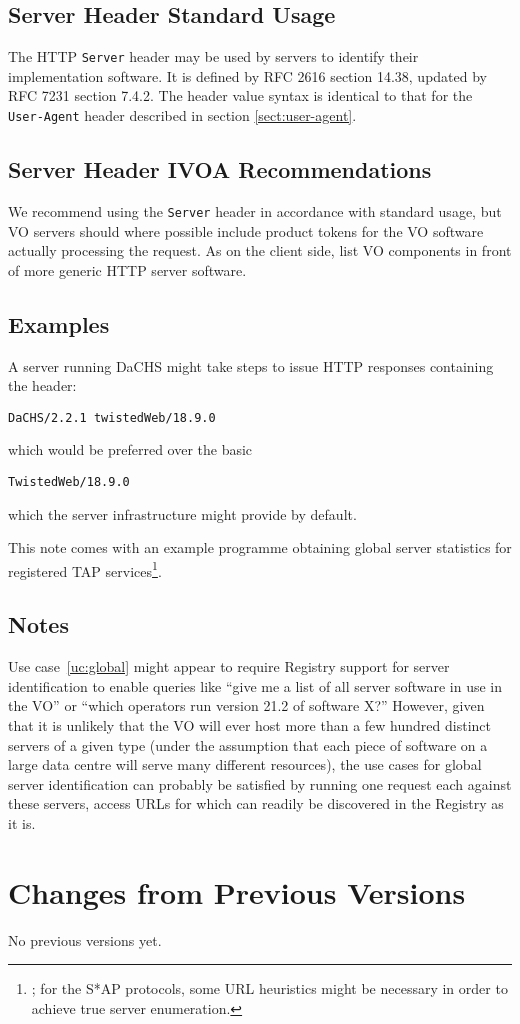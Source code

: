 \documentclass[11pt,a4paper]{ivoa}
\newcommand{\headername}[1]{{\tt #1}}
\begin{document}
\subsection{Server Header Standard Usage}

The HTTP \headername{Server} header may be used by servers to
identify their implementation software.
It is defined by RFC 2616 section 14.38,
updated by RFC 7231 section 7.4.2.
The header value syntax is identical to that for the
\headername{User-Agent} header described in section \ref{sect:user-agent}.

\subsection{Server Header IVOA Recommendations}

We recommend using the \headername{Server} header
in accordance with standard usage,
but VO servers should where possible include product tokens
for the VO software actually processing the request.
As on the client side, list VO components in front of
more generic HTTP server software.

\subsection{Examples}

A server running DaCHS might take steps to issue HTTP responses
containing the header:
\begin{verbatim}
DaCHS/2.2.1 twistedWeb/18.9.0
\end{verbatim}
which would be preferred over the basic
\begin{verbatim}
TwistedWeb/18.9.0
\end{verbatim}
which the server infrastructure might provide by default.

This note comes with an example programme obtaining global server
statistics for registered TAP
services\footnote{; for the S*AP protocols,
some URL heuristics might be necessary in order to achieve true server
enumeration.}.

\subsection{Notes}

Use case~\ref{uc:global} might appear to require Registry support for
server identification to enable queries like ``give me a list of all
server software in use in the VO'' or ``which operators run version 21.2
of software X?''  However, given that it is unlikely that the VO will
ever host more than a few hundred distinct servers of a given type
(under the assumption that each piece of software on a large data centre
will serve many different resources), the use cases for global server
identification can probably be satisfied by running one request each
against these servers, access URLs for which can readily be discovered
in the Registry as it is.  

\appendix
\section{Changes from Previous Versions}

No previous versions yet.  



\end{document}
